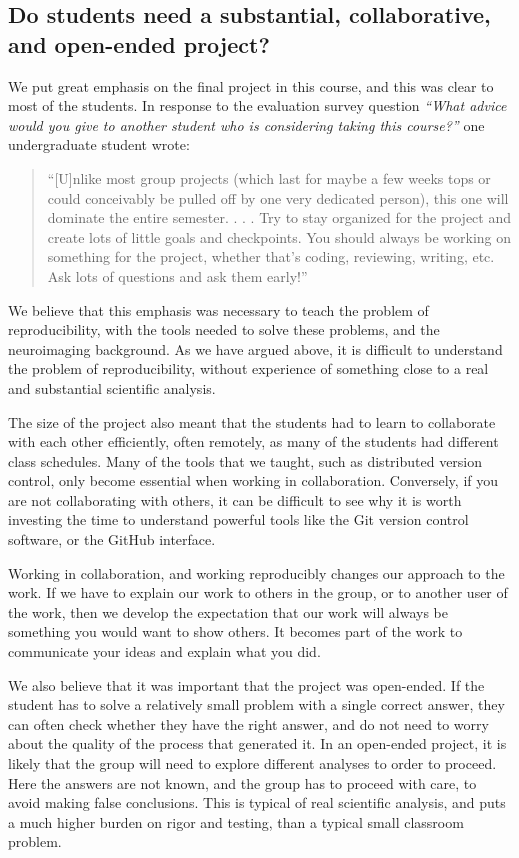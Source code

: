 \subsection{Do students need a substantial, collaborative, and open-ended project?}

We put great emphasis on the final project in this course, and this was clear
to most of the students.  In response to the evaluation survey question
\emph{``What advice would you give to another student who is considering taking this course?''}
one undergraduate student wrote:
\begin{quotation}
``[U]nlike most group projects (which last for maybe a few weeks tops or
could conceivably be pulled off by one very dedicated person), this one will
dominate the entire semester. . . . Try to stay organized for the project and
create lots of little goals and checkpoints. You should always be working on
something for the project, whether that's coding, reviewing, writing, etc. Ask
lots of questions and ask them early!''
\end{quotation}

We believe that this emphasis was necessary to teach the problem of
reproducibility, with the tools needed to solve these problems, and the
neuroimaging background.  As we have argued above, it is difficult to
understand the problem of reproducibility, without experience of something
close to a real and substantial scientific analysis.

The size of the project also meant that the students had to learn to
collaborate with each other efficiently, often remotely, as many of the
students had different class schedules.  Many of the tools that we taught,
such as distributed version control, only become essential when working in
collaboration.  Conversely, if you are not collaborating with others, it can
be difficult to see why it is worth investing the time to understand powerful
tools like the Git version control software, or the GitHub interface.

Working in collaboration, and working reproducibly changes our approach to the
work. If we have to explain our work to others in the group, or to
another user of the work, then we develop the expectation that our work
will always be something you would want to show others.  It becomes part of
the work to communicate your ideas and explain what you did.

We also believe that it was important that the project was open-ended.  If the
student has to solve a relatively small problem with a single correct answer,
they can often check whether they have the right answer, and do not need to
worry about the quality of the process that generated it.  In an open-ended
project, it is likely that the group will need to explore different analyses
to order to proceed.  Here the answers are not known, and the group has to
proceed with care, to avoid making false conclusions.  This is typical of real
scientific analysis, and puts a much higher burden on rigor and testing, than
a typical small classroom problem.

